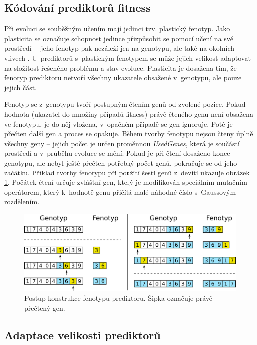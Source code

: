 \documentclass[czech]{ExcelAtFIT} %
\begin{document}
\subsection{Kódování prediktorů fitness}

Při evoluci se souběžným učením mají jedinci tzv. plas\-tický fenotyp. Jako plasticita se označuje schopnost jedince přizpůsobit se pomocí učení na své prostředí~-- jeho fenotyp pak nezáleží jen na genotypu, ale také na okolních vlivech \cite{EllefsenBalancing}. U~prediktorů s~plastickým fenotypem se může jejich velikost adaptovat na složitost řešeného problému a stav evoluce. Plasticita je dosažena tím, že fenotyp prediktoru netvoří všechny ukazatele obsažené v~genotypu, ale pouze jejich část.

Fenotyp se z~genotypu tvoří postupným čtením genů od zvolené pozice. Pokud hodnota (ukazatel do množiny případů fitness) právě čteného genu není obsažena ve fenotypu, je do něj vložena, v~opačném případě se gen ignoruje. Poté je přečten další gen a proces se opakuje. Během tvorby fenotypu nejsou čteny úplně všechny geny -- jejich počet je určen proměnnou \emph{UsedGenes}, která je součástí prostředí a v~průběhu evoluce se mění. Pokud je při čtení dosaženo konce genotypu, ale nebyl ještě přečten potřebný počet genů, pokračuje se od jeho začátku. Příklad tvorby fenotypu při použití šesti genů z~devíti ukazuje obrázek \ref{fig:PhenotypeContruction}. Počátek čtení určuje zvláštní gen, který je modifikován speciálním mutačním operátorem, který k~hodnotě genu přičítá malé náhodné číslo s~Gaussovým rozdělením.

\begin{figure}[b]
    \centering\includegraphics[width=\linewidth]{images/phenotype2.pdf}
    \caption{Postup konstrukce fenotypu prediktoru. Šipka označuje právě přečtený gen.}
    \label{fig:PhenotypeContruction}
\end{figure}

\subsection{Adaptace velikosti prediktorů}
\end{document}
